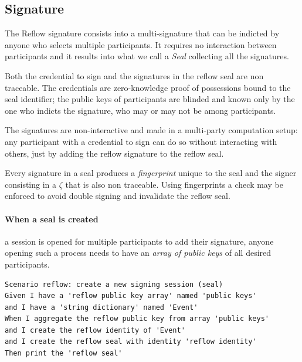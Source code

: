 \documentclass[twocolumn]{article}
\begin{document}
\onecolumn

\subsection{Signature}


The Reflow signature consists into a multi-signature that can be
indicted by anyone who selects multiple participants. It requires no
interaction between participants and it results into what we call a
\emph{Seal} collecting all the signatures.


Both the credential to sign and the signatures in the reflow seal are
non traceable. The credentials are zero-knowledge proof of possessions
bound to the seal identifier; the public keys of participants are
blinded and known only by the one who indicts the signature, who may
or may not be among participants.

The signatures are non-interactive and made in a multi-party
computation setup: any participant with a credential to sign can do so
without interacting with others, just by adding the reflow signature
to the reflow seal.

Every signature in a seal produces a \emph{fingerprint} unique to the
seal and the signer consisting in a $\zeta$ that is also non
traceable. Using fingerprints a check may be enforced to avoid double
signing and invalidate the reflow seal.

\paragraph{When a seal is created} a session is opened for multiple
participants to add their signature, anyone opening such a process
needs to have an \emph{array of public keys} of all desired
participants.

\begin{lstlisting}[style=zencode,caption={Create reflow seal}]
Scenario reflow: create a new signing session (seal)
Given I have a 'reflow public key array' named 'public keys'
and I have a 'string dictionary' named 'Event'
When I aggregate the reflow public key from array 'public keys'
and I create the reflow identity of 'Event'
and I create the reflow seal with identity 'reflow identity'
Then print the 'reflow seal'
\end{lstlisting}
\end{document}
